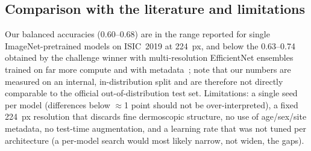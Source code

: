 \subsection{Comparison with the literature and limitations}
Our balanced accuracies (0.60--0.68) are in the range reported for single ImageNet-pretrained
models on ISIC~2019 at 224~px, and below the 0.63--0.74 obtained by the challenge winner with
multi-resolution EfficientNet ensembles trained on far more compute and with
metadata~\cite{gessert2020isic2019}; note that our numbers are measured on an internal,
in-distribution split and are therefore not directly comparable to the official out-of-distribution
test set. Limitations: a single seed per model (differences below $\approx$1 point should not be
over-interpreted), a fixed 224~px resolution that discards fine dermoscopic structure, no use of
age/sex/site metadata, no test-time augmentation, and a learning rate that was not tuned per
architecture (a per-model search would most likely narrow, not widen, the gaps).
